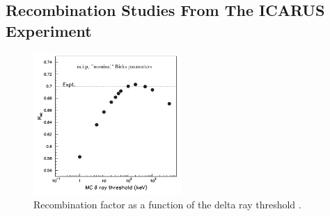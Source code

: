 %

\subsection{Recombination Studies From The ICARUS Experiment}
\label{sec:icarus}

\begin{figure}[bp!]
\centering 
\includegraphics[width=0.5\textwidth]{icarus_recomb}
\caption[Recombination Factor Against Delta Ray Threshold]{
Recombination factor as a function of the delta ray threshold \cite{icarus_recomb}.
}
\label{fig:icarus_recomb}
\end{figure}

